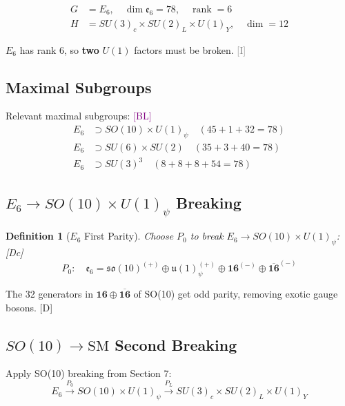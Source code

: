 \documentclass[11pt,a4paper]{article}
\newtheorem{definition}[theorem]{Definition}
\newcommand{\tagD}{\textcolor{blue!70!black}{[D]}}
\newcommand{\tagDc}{\textcolor{blue!50!black}{[Dc]}}
\newcommand{\tagI}{\textcolor{gray}{[I]}}
\newcommand{\tagBL}{\textcolor{purple}{[BL]}}
\DeclareMathOperator{\rank}{rank}
\begin{document}
\begin{align}
\label{eq:e6-dim}
G &= E_6, \quad \dim \mathfrak{e}_6 = 78, \quad \rank = 6 \\
\label{eq:e6-target}
H &= SU(3)_c \times SU(2)_L \times U(1)_Y, \quad \dim = 12
\end{align}

$E_6$ has rank 6, so \textbf{two} $U(1)$ factors must be broken. \tagI

\subsection{Maximal Subgroups}

Relevant maximal subgroups: \tagBL
\begin{align}
\label{eq:e6-so10}
E_6 &\supset SO(10) \times U(1)_\psi \quad (45 + 1 + 32 = 78) \\
\label{eq:e6-su6}
E_6 &\supset SU(6) \times SU(2) \quad (35 + 3 + 40 = 78) \\
\label{eq:e6-su3}
E_6 &\supset SU(3)^3 \quad (8 + 8 + 8 + 54 = 78)
\end{align}

\subsection{$E_6 \to SO(10) \times U(1)_\psi$ Breaking}

\begin{definition}[$E_6$ First Parity]
\label{def:e6-P0}
Choose $P_0$ to break $E_6 \to SO(10) \times U(1)_\psi$: \tagDc
\begin{equation}
\label{eq:e6-P0}
P_0: \quad \mathfrak{e}_6 = \mathfrak{so}(10)^{(+)} \oplus \mathfrak{u}(1)_\psi^{(+)} \oplus \mathbf{16}^{(-)} \oplus \overline{\mathbf{16}}^{(-)}
\end{equation}
\end{definition}

The 32 generators in $\mathbf{16} \oplus \overline{\mathbf{16}}$ of SO(10) get
odd parity, removing exotic gauge bosons. \tagD

\subsection{$SO(10) \to \text{SM}$ Second Breaking}

Apply SO(10) breaking from Section 7:
\begin{equation}
\label{eq:e6-cascade}
E_6 \xrightarrow{P_0} SO(10) \times U(1)_\psi \xrightarrow{P_L} SU(3)_c \times SU(2)_L \times U(1)_Y
\end{equation}
\end{document}
